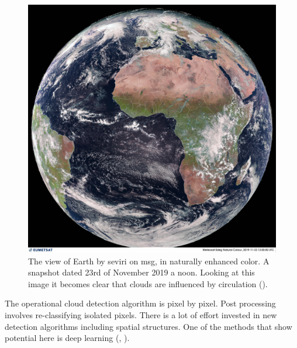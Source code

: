 \begin{figure}[h]
    \centering
    \includegraphics[scale=0.11]{Chapter2_Theory/images/MET10_RGBNatColourEnhncd_FullResolution_20191123120000.jpg}    
    \caption{The view of Earth by \acrshort{seviri} on \acrshort{msg}, in naturally enhanced color. A snapshot dated 23rd of November 2019 a noon. Looking at this image it becomes clear that clouds are influenced by circulation  (\cite{eumetcast_image_gallery}).}
    \label{fig:sat_view}
\end{figure}
The operational cloud detection algorithm is pixel by pixel. Post processing involves re-classifying isolated pixels. There is a lot of effort invested in new detection algorithms including spatial structures. One of the methods that show potential here is deep learning (\cite{Dronner2018FastNetworks}, \cite{jeppesen_deep_cloud_masking}).


